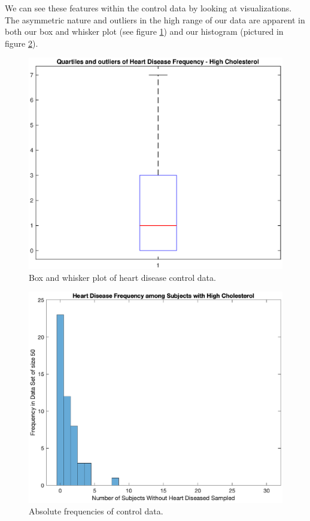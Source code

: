 \documentclass{amsart}
\begin{document}
We can see these features within the control data by looking at visualizations. The asymmetric nature and outliers in the high range of our data are apparent in both our box and whisker plot (see figure \ref{F:boxplotfinal}) and our histogram (pictured in figure \ref{F:absoluteFrequencies}).
\begin{figure}
\centering
\includegraphics[scale=0.55]{boxplotfinal}
\caption{Box and whisker plot of heart disease control data.\label{F:boxplotfinal}}
\end{figure}

\begin{figure}
\centering
\includegraphics[scale=0.55]{histogramfinal}
\caption{Absolute frequencies of control data.\label{F:absoluteFrequencies}}
\end{figure}
\end{document}
